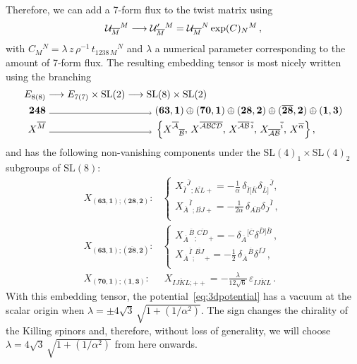\documentclass[a4paper, 11pt]{article}
\numberwithin{equation}{section}
\newcommand{\ov}[1]{\overline{#1}}
\newcommand{\SL}[1]{\mathrm{SL}( #1 )}
\newcommand{\EE}{\ensuremath{E_{8(8)}}\xspace}
\newcommand{\+}{\oplus}
\newcommand{\cU}{{\cal U}}
\newcommand{\fl}[1]{\ov{#1}}
\begin{document}
Therefore, we can add a 7-form flux to the twist matrix using
\begin{equation}
	\cU_{\fl{M}}{}^M \longrightarrow \cU'_{\fl{M}}{}^M = \cU_{\fl{M}}{}^N \exp(C)_N{}^M \,,
\end{equation}
with $C_M{}^N = \lambda\, z\,\rho^{-1}\, t_{1238\,M}{}^N$ and $\lambda$ a numerical parameter corresponding to the amount of 7-form flux. The resulting embedding tensor is most nicely written using the branching
\begin{equation} \label{eq:248decompoinSL8}
	\begin{aligned}
		\EE & \longrightarrow E_{7(7)}\times {\rm SL}(2) \longrightarrow {\rm SL}(8) \times {\rm SL}(2) \\
		\mathbf{248} & \ \tikz{\draw[arrows={->[scale=1.1]}] (0,0) -- (3.65
	,0);}\  (\mathbf{63},\mathbf{1}) \oplus (\mathbf{70},\mathbf{1}) \oplus (\mathbf{28},\mathbf{2}) \oplus (\mathbf{\fl{28}},\mathbf{2}) \oplus (\mathbf{1},\mathbf{3}) \\
		X^{\fl{M}} & \ \tikz{\draw[arrows={->[scale=1.1]}] (0,0) -- (3.65
	,0);}\ \left\{X^{\fl{\cal A}}{}_{\fl{\cal B}},\,X^{\fl{\cal ABCD}},\,X^{\fl{\cal AB}\,\fl{i}},\,X_{\fl{\cal AB}}{}^{\fl{i}},\,X^{\fl{\alpha}}\right\},
	\end{aligned}
\end{equation}
and has the following non-vanishing components under the $\SL{4}_1 \times \SL{4}_2$ subgroups of $\SL{8}$:
\begin{equation} \label{eq:embeddingtensor@origin}
	\begin{split}
		X_{(\mathbf{63},\mathbf{1});(\mathbf{28},\mathbf{2})}:&
		\begin{cases}
			\displaystyle X_{\fl{I}}{}^{\fl{J}}{}_{;\fl{KL}+}=-\frac{1}{\alpha}\,\delta_{\fl{I}[\fl{K}}\delta_{\fl{L}]}{}^{\fl{J}},\\[7pt]
			\displaystyle X_{\fl{A}}{}^{\fl{I}}{}_{;\fl{BJ}+}=-\frac{1}{2\alpha}\,\delta_{\fl{AB}}\delta_{\fl{J}}{}^{\fl{I}}\,,\\
		\end{cases} \\[5pt]
		X_{(\mathbf{63},\mathbf{1});(\mathbf{\fl{28}},\mathbf{2})}:&
		\begin{cases}
			\displaystyle X_{\fl{A}}{}^{\fl{B}}{}_{;}{}^{\fl{CD}}{}_{+}=-\,\delta_{\fl{A}}{}^{[\fl{C}}\delta^{\fl{D}]\fl{B}}\,,\\[7pt]
			\displaystyle X_{\fl{A}}{}^{\fl{I}}{}_{;}{}^{\fl{BJ}}{}_{+}=-\frac{1}{2}\,\delta_{\fl{A}}{}^{\fl{B}}\delta^{\fl{IJ}}\,,\\
		\end{cases} \\[5pt]
		X_{(\mathbf{70},\mathbf{1});(\mathbf{1},\mathbf{3})}:&\  X_{\fl{IJKL};++} = -\frac{\lambda}{12\sqrt{6}}\,\varepsilon_{\fl{IJKL}}\,.
	\end{split}
\end{equation}
With this embedding tensor, the potential~\eqref{eq:3dpotential} has a vacuum at the scalar origin when $\lambda=\pm4\sqrt{3}\,\sqrt{1+(1/\alpha^{2})}$. The sign changes the chirality of the Killing spinors and, therefore, without loss of generality, we will choose $\lambda = 4\sqrt{3}\,\sqrt{1+(1/\alpha^{2})}$ from here onwards.
\end{document}
